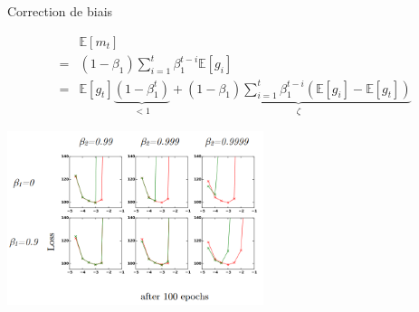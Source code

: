 \documentclass[11pt,aspectratio=169,xcolor=dvipsnames, french]{beamer}
\begin{document}
% 
% 
% 
% 
%  
% 
% 
%  
%  
% 
% 
% 
% 
%  
% 
% 

\begin{frame}{Correction de biais}
	\begin{minipage}[c]{.45\linewidth}
	\scriptsize
$$\begin{array}{ll}
&\mathbb E[m_t]\\
=&(1-\beta_1)\displaystyle\sum_{i=1}^t\beta_1^{t-i}\mathbb E[g_i]\\
=& \mathbb E[g_t]\underset{<1}{\underbrace{(1-\beta_1^t)}}+\underset{\zeta}{\underbrace{(1-\beta_1)\sum_{i=1}^t\beta_1^{t-i}(\mathbb E[g_i]-\mathbb E[g_t])}}
\end{array}$$
	\end{minipage} \hfill
	\begin{minipage}[c]{.5\linewidth}
\includegraphics[width=7.5cm]{../Images/bias_epochs100.png}

	\end{minipage}
\end{frame}
\end{document}
